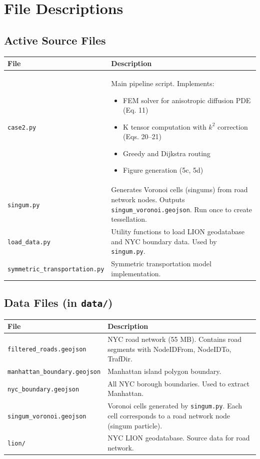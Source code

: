 \documentclass[11pt]{article}
\begin{document}
\section{File Descriptions}

\subsection{Active Source Files}

\begin{longtable}{p{4.5cm}p{9cm}}
\toprule
\textbf{File} & \textbf{Description} \\
\midrule
\endfirsthead

\texttt{case2.py} & Main pipeline script. Implements:
\begin{itemize}[noitemsep,topsep=0pt]
    \item FEM solver for anisotropic diffusion PDE (Eq. 11)
    \item K tensor computation with $k^2$ correction (Eqs. 20--21)
    \item Greedy and Dijkstra routing
    \item Figure generation (5c, 5d)
\end{itemize} \\
\midrule
\texttt{singum.py} & Generates Voronoi cells (singums) from road network nodes. Outputs \texttt{singum\_voronoi.geojson}. Run once to create tessellation. \\
\midrule
\texttt{load\_data.py} & Utility functions to load LION geodatabase and NYC boundary data. Used by \texttt{singum.py}. \\
\midrule
\texttt{symmetric\_transportation.py} & Symmetric transportation model implementation. \\
\bottomrule
\end{longtable}

\subsection{Data Files (in \texttt{data/})}

\begin{longtable}{p{4.5cm}p{9cm}}
\toprule
\textbf{File} & \textbf{Description} \\
\midrule
\endfirsthead

\texttt{filtered\_roads.geojson} & NYC road network (55 MB). Contains road segments with NodeIDFrom, NodeIDTo, TrafDir. \\
\midrule
\texttt{manhattan\_boundary.geojson} & Manhattan island polygon boundary. \\
\midrule
\texttt{nyc\_boundary.geojson} & All NYC borough boundaries. Used to extract Manhattan. \\
\midrule
\texttt{singum\_voronoi.geojson} & Voronoi cells generated by \texttt{singum.py}. Each cell corresponds to a road network node (singum particle). \\
\midrule
\texttt{lion/} & NYC LION geodatabase. Source data for road network. \\
\bottomrule
\end{longtable}
\end{document}
